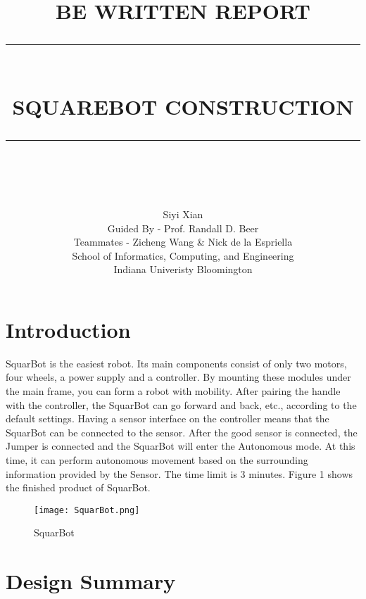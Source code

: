 \documentclass[12pt]{report}
\newcommand{\HRule}[1]{\rule{\linewidth}{#1}}
\begin{document}
\title{ \normalsize \textsc{BE WRITTEN REPORT}
		\\ [2.0cm]
		\HRule{0.5pt} \\
		\LARGE \textbf{\uppercase{SquareBot Construction}}
		\HRule{2pt} \\ [0.5cm]
		\normalsize  \vspace*{5\baselineskip}}

\date{}

\author{
		\Large Siyi Xian \\
		Guided By - Prof. Randall D. Beer  \\
        Teammates - Zicheng Wang \& Nick de la Espriella\\
School of Informatics, Computing, and Engineering\\
Indiana Univeristy Bloomington\\ }

\maketitle
\newpage

\tableofcontents
\newpage

\section{Introduction}
 SquarBot is the easiest robot. Its main components consist of only two motors, four wheels, a power supply and a controller. By mounting these modules under the main frame, you can form a robot with mobility. After pairing the handle with the controller, the SquarBot can go forward and back, etc., according to the default settings. Having a sensor interface on the controller means that the SquarBot can be connected to the sensor. After the good sensor is connected, the Jumper is connected and the SquarBot will enter the Autonomous mode. At this time, it can perform autonomous movement based on the surrounding information provided by the Sensor. The time limit is 3 minutes. Figure 1 shows the finished product of SquarBot.
\begin{figure}[htbp]
	\centering
	\texttt{[image: SquarBot.png]}
	\caption{SquarBot}
\end{figure}

\section{Design Summary}
\end{document}

